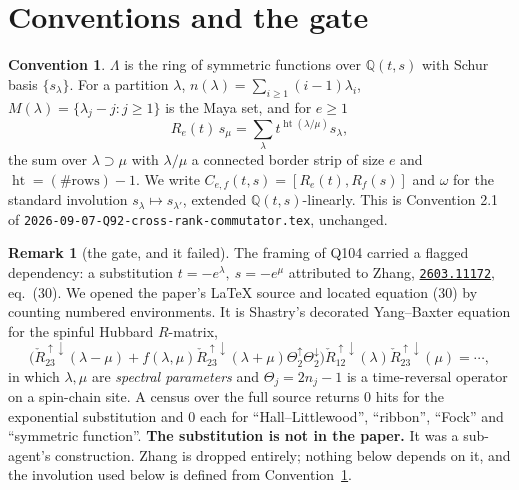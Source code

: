 \documentclass[11pt]{article}
\theoremstyle{definition}
\newtheorem{remark}[theorem]{Remark}
\newtheorem{convention}[theorem]{Convention}
\newcommand{\hgt}{\operatorname{ht}}   %
\newcommand{\Z}{\mathbb{Z}}
\newcommand{\Q}{\mathbb{Q}}
\newcommand{\Lam}{\Lambda}
\begin{document}
\begin{abstract}
\textbf{(D)} The two-bead sector of $[R_e(t),R_f(s)]$ vanishes on $ts=1$ for
\emph{all} $e,f\ge1$, and the mechanism is local on the Maya diagram: reversing the
order of two disjoint bead moves multiplies the weight by exactly $(ts)^k$.

\textbf{The negative, stated plainly.}  (C) does \emph{not} imply (D).  The one-bead
sector also lies in the $(-1)$-eigenspace on $ts=1$ and is \emph{nonzero} there
($52/52$ matrix entries survive, against $0/58$ in the two-bead sector).  The
programme's hope that all four sightings of $ts=1$ become corollaries of one
$\Z/2$ is therefore \textbf{false}: two of them do, two do not.
\end{abstract}

\section{Conventions and the gate}

\begin{convention}\label{conv:main}
$\Lam$ is the ring of symmetric functions over $\Q(t,s)$ with Schur basis
$\{s_\lambda\}$.  For a partition $\lambda$, $n(\lambda)=\sum_{i\ge1}(i-1)\lambda_i$,
$M(\lambda)=\{\lambda_j-j:j\ge1\}$ is the Maya set, and for $e\ge1$
\[
  R_e(t)\,s_\mu=\sum_{\lambda}t^{\hgt(\lambda/\mu)}s_\lambda,
\]
the sum over $\lambda\supset\mu$ with $\lambda/\mu$ a connected border strip of size
$e$ and $\hgt=(\#\text{rows})-1$.  We write $C_{e,f}(t,s)=[R_e(t),R_f(s)]$ and
$\omega$ for the standard involution $s_\lambda\mapsto s_{\lambda'}$, extended
$\Q(t,s)$-linearly.  This is Convention 2.1 of
\texttt{2026-09-07-Q92-cross-rank-commutator.tex}, unchanged.
\end{convention}

\begin{remark}[the gate, and it failed]\label{rem:gate}
The framing of Q104 carried a flagged dependency: a substitution
$t=-e^{\lambda},\ s=-e^{\mu}$ attributed to Zhang,
\href{https://arxiv.org/abs/2603.11172}{\texttt{2603.11172}}, eq.~(30).  We opened the
paper's \LaTeX{} source and located equation (30) by counting numbered environments.
It is Shastry's decorated Yang--Baxter equation for the spinful Hubbard
$R$-matrix,
\[
  \bigl(\check R^{\uparrow\downarrow}_{23}(\lambda-\mu)
   +f(\lambda,\mu)\check R^{\uparrow\downarrow}_{23}(\lambda+\mu)
   \Theta^\uparrow_2\Theta^\downarrow_2\bigr)
  \check R^{\uparrow\downarrow}_{12}(\lambda)\check R^{\uparrow\downarrow}_{23}(\mu)
  =\cdots,
\]
in which $\lambda,\mu$ are \emph{spectral parameters} and $\Theta_j=2n_j-1$ is a
time-reversal operator on a spin-chain site.  A census over the full source returns
$0$ hits for the exponential substitution and $0$ each for ``Hall--Littlewood'',
``ribbon'', ``Fock'' and ``symmetric function''.  \textbf{The substitution is not in
the paper.}  It was a sub-agent's construction.  Zhang is dropped entirely; nothing
below depends on it, and the involution used below is defined from
Convention~\ref{conv:main}.
\end{remark}
\end{document}
